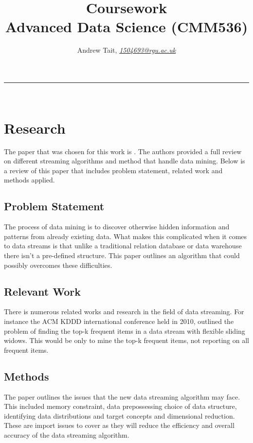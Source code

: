\documentclass[10pt  ,usenames, dvipsnames]{article}\usepackage[]{graphicx}\usepackage[]{color}
\begin{document}
\title{\LARGE Coursework  \\ Advanced Data Science (CMM536)}

\author{Andrew Tait, \textit{\href{1504693@rgu.ac.uk}{1504693@rgu.ac.uk}}}
\maketitle
\noindent\rule{16cm}{0.4pt}
\ \\

\section{Research}
The paper that was chosen for this work is \cite{PHRIDVIRAJ2014255}. The authors provided a full review on different streaming algorithms and method that handle data mining. Below is a review of this paper that includes problem statement, related work and methods applied.

\subsection{Problem Statement}
The process of data mining is to discover otherwise hidden information and patterns from already existing data. What makes this complicated when it comes to data streams is that unlike a traditional relation database or data warehouse there isn't a pre-defined structure. This paper outlines an algorithm that could possibly overcomes these difficulties.

\subsection{Relevant Work}
There is numerous related works and research in the field of data streaming. For instance the ACM KDDD international conference held in 2010, outlined the problem of finding the top-k frequent items in a data stream with flexible sliding widows. This would be only to mine the top-k frequent items, not reporting on all frequent items.

\subsection{Methods}
The paper outlines the issues that the new data streaming algorithm may face. This included memory constraint, data prepossessing choice of data structure, identifying data distributions and target concepts and dimensional reduction.
These are import issues to cover as they will reduce the efficiency and overall accuracy of the data streaming algorithm.
\end{document}
